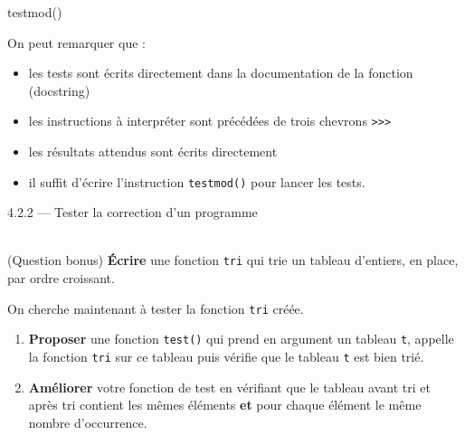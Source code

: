 \documentclass[a4paper,17pt]{extarticle}
\newenvironment{eleve}%
{\begin{activite}\color{noiramu}\\[-0.5cm]}
{\end{activite}}
\providecommand{\tightlist}{%
      \setlength{\itemsep}{0pt}\setlength{\parskip}{0pt}}
\newenvironment{Shaded}{}{}
\newcommand{\NormalTok}[1]{{#1}}
\begin{document}
\begin{exemple}
\begin{Shaded}
\begin{Highlighting}[]
\NormalTok{testmod()}
\end{Highlighting}
\end{Shaded}

On peut remarquer que :

\begin{itemize}
\tightlist
\item
  les tests sont écrits directement dans la documentation de la fonction
  (docstring)
\item
  les instructions à interpréter sont précédées de trois chevrons
  \texttt{\textgreater{}\textgreater{}\textgreater{}}
\item
  les résultats attendus sont écrits directement
\item
  il suffit d'écrire l'instruction \texttt{testmod()} pour lancer les
  tests.
\end{itemize}

        \end{exemple}
    4.2.2 --- Tester la correction d'un programme
\begin{eleve}
    (Question bonus) \textbf{Écrire} une fonction \texttt{tri} qui trie un
tableau d'entiers, en place, par ordre croissant.

On cherche maintenant à tester la fonction \texttt{tri} créée.

\begin{enumerate}
\def\labelenumi{\arabic{enumi}.}
\tightlist
\item
  \textbf{Proposer} une fonction \texttt{test()} qui prend en argument
  un tableau \texttt{t}, appelle la fonction \texttt{tri} sur ce tableau
  puis vérifie que le tableau \texttt{t} est bien trié.
\item
  \textbf{Améliorer} votre fonction de test en vérifiant que le tableau
  avant tri et après tri contient les mêmes éléments \textbf{et} pour
  chaque élément le même nombre d'occurrence.
\end{enumerate}
        
        \end{eleve}
\end{document}
